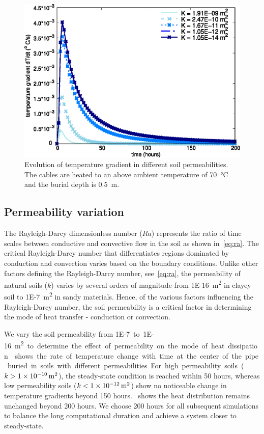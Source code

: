 \documentclass[Journal,letterpaper,InsideFigs]{ascelike-new}
\begin{document}
\begin{figure}
    \centering
    \includegraphics{figs/dTdt.eps}
    \caption{Evolution of temperature gradient in different soil permeabilities. The cables are heated to an above ambient temperature of \SI{70}{\celsius} and the burial depth is \SI{0.5}{\meter}.}
    \label{fig:dTdt}
\end{figure}

\subsection*{Permeability variation}
The Rayleigh-Darcy dimensionless number ($Ra$) represents the ratio of time scales between conductive and convective flow in the soil as shown in~\cref{eq:ra}. The critical Rayleigh-Darcy number that differentiates regions dominated by conduction and convection varies based on the boundary conditions. Unlike other factors defining the Rayleigh-Darcy number, see~\cref{eq:ra}, the permeability of natural soils ($k$) varies by several orders of magnitude from \SI{1E-16}{\meter\squared} in clayey soil to \SI{1E-7}{\meter\squared} in sandy materials. Hence, of the various factors influencing the Rayleigh-Darcy number, the soil permeability is a critical factor in determining the mode of heat transfer - conduction or convection.

We vary the soil permeability from \SI{1E-7} to \SI{1E-16}{\meter\squared} to determine the effect of permeability on the mode of heat dissipation.~ shows the rate of temperature change with time at the center of the pipe buried in soils with different permeabilities. For high permeability soils ($k > \SI{1E-10}{\meter\squared}$), the steady-state condition is reached within 50 hours, whereas low permeability soils ($k < \SI{1E-12}{\meter\squared}$) show no noticeable change in temperature gradients beyond 150 hours.~ shows the heat distribution remains unchanged beyond 200 hours. We choose 200 hours for all subsequent simulations to balance the long computational duration and achieve a system closer to steady-state. 
\end{document}
